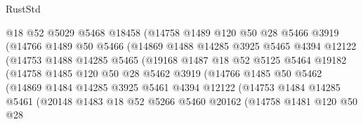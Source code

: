 \begin{lexlean}{RustStd}
\begin{coremodule}
                      @18
                      @52
                      @5029
                      @5468
                      @18458
                      (@14758
                        @1489
                        @120
                        @50
                        @28
                        @5466
                        @3919
                        (@14766
                          @1489
                          @50
                          @5466
                          (@14869
                            @1488
                            @14285
                            @3925
                            @5465
                            @4394
                            @12122
                            (@14753
                              @1488
                              @14285
                              @5465
                              (@19168
                                @1487
                                @18
                                @52
                                @5125
                                @5464
                                @19182
                                (@14758
                                  @1485
                                  @120
                                  @50
                                  @28
                                  @5462
                                  @3919
                                  (@14766
                                    @1485
                                    @50
                                    @5462
                                    (@14869
                                      @1484
                                      @14285
                                      @3925
                                      @5461
                                      @4394
                                      @12122
                                      (@14753
                                        @1484
                                        @14285
                                        @5461
                                        (@20148
                                          @1483
                                          @18
                                          @52
                                          @5266
                                          @5460
                                          @20162
                                          (@14758
                                            @1481
                                            @120
                                            @50
                                            @28

\end{coremodule}
\end{lexlean}
